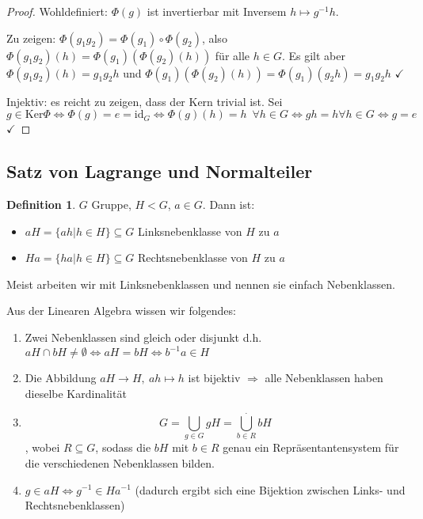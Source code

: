 \documentclass[12pt,a4paper]{article}
\newcounter{defcounter}[subsection]
\theoremstyle{definition}
\newtheorem{defi}[defcounter]{Definition}
\theoremstyle{remark}
\theoremstyle{definition}
\theoremstyle{definition}
\theoremstyle{plain}
\theoremstyle{plain}
\begin{document}
\begin{proof}
	\leavevmode
	
	Wohldefiniert: $\Phi(g)$ ist invertierbar mit Inversem $h\mapsto g^{-1}h$.
	
	Zu zeigen: $\Phi(g_1g_2) = \Phi(g_1)\circ \Phi(g_2)$, also $\Phi(g_1g_2)(h) = \Phi(g_1)(\Phi(g_2)(h))$ für alle $h\in G$. Es gilt aber $\Phi(g_1g_2)(h) = g_1g_2h$ und $\Phi(g_1)(\Phi(g_2)(h)) = \Phi(g_1)(g_2h) = g_1g_2h$ \hfill$\checkmark$
	
	Injektiv: es reicht zu zeigen, dass der Kern trivial ist. Sei $g\in \text{Ker}\Phi\Leftrightarrow \Phi(g) = e = \text{id}_G \Leftrightarrow \Phi(g)(h)= h\enspace \forall h\in G\Leftrightarrow gh = h\forall h\in G\Leftrightarrow g= e$\hfill $\checkmark$
\end{proof}


\subsection{Satz von Lagrange und Normalteiler}
\begin{defi}
	$G$ Gruppe, $H<G$, $a\in G$. Dann ist:
	\begin{itemize}
		\item[] $aH = \{ah|h\in H\}\subseteq G$ Linksnebenklasse von $H$ zu $a$
		\item[] $Ha = \{ha|h\in H\}\subseteq G$ Rechtsnebenklasse von $H$ zu $a$
	\end{itemize}
	Meist arbeiten wir mit Linksnebenklassen und nennen sie einfach Nebenklassen.
\end{defi}

\noindent
Aus der Linearen Algebra wissen wir folgendes: \begin{enumerate}
	\item Zwei Nebenklassen sind gleich oder disjunkt d.h. $aH\cap bH \neq \emptyset \Leftrightarrow aH = bH\Leftrightarrow b^{-1}a \in H$
	\item Die Abbildung $aH\to H,\ ah\mapsto h$ ist bijektiv $\Rightarrow$ alle Nebenklassen haben dieselbe Kardinalität
	\item $$ G = \bigcup\limits_{g\in G}gH = \overset{.}{\bigcup\limits_{b\in R} }bH$$, wobei $R\subseteq G$, sodass die $bH$ mit $b\in R$ genau ein Repräsentantensystem für die verschiedenen Nebenklassen bilden.
	\item $g\in aH\Leftrightarrow g^{-1}\in Ha^{-1}$ (dadurch ergibt sich eine Bijektion zwischen Links- und Rechtsnebenklassen)
	
\end{enumerate}
\end{document}
